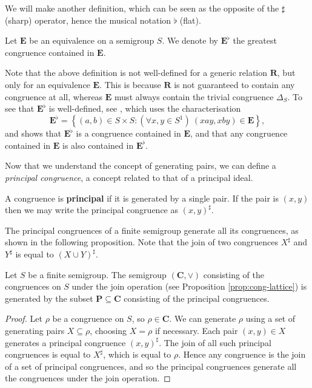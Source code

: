 We will make another definition, which can be seen as the opposite of the
$\sharp$ (sharp) operator, hence the musical notation $\flat$ (flat).

\begin{definition}
  \label{def:e-flat}
  Let $\mathbf{E}$ be an equivalence on a semigroup $S$.  We denote by
  $\mathbf{E}^\flat$ the greatest congruence contained in $\mathbf{E}$.
\end{definition}

Note that the above definition is not well-defined for a generic relation
$\mathbf{R}$, but only for an equivalence $\mathbf{E}$.  This is because
$\mathbf{R}$ is not guaranteed to contain any congruence at all, whereas
$\mathbf{E}$ must always contain the trivial congruence $\Delta_S$.
To see that $\mathbf{E}^\flat$ is well-defined, see \cite[Proposition
1.5.10]{howie}, which uses the characterisation
$$\mathbf{E}^\flat = \left\{
  (a,b) \in S \times S : (\forall x, y \in S^1)~(xay, xby) \in \mathbf{E}
\right\},$$ and shows that $\mathbf{E}^\flat$ is a congruence contained in
$\mathbf{E}$, and that any congruence contained in $\mathbf{E}$ is also
contained in $\mathbf{E}^\flat$.

Now that we understand the concept of generating pairs, we can define a
\textit{principal congruence}, a concept related to that of a principal ideal.

\begin{definition}
  \label{def:principal-cong}
  A congruence is \textbf{principal} if it is generated by a single pair.  If
  the pair is $(x,y)$ then we may write the principal congruence as
  $(x,y)^\sharp$.
\end{definition}

The principal congruences of a finite semigroup generate all its congruences, as
shown in the following proposition.  Note that the join of two congruences
$X^\sharp$ and $Y^\sharp$ is equal to $(X \cup Y)^\sharp$.

\begin{proposition}
  \label{prop:congruence-lattice-gens}
  Let $S$ be a finite semigroup.  The semigroup $(\mathbf{C}, \vee)$ consisting
  of the congruences on $S$ under the join operation (see Proposition
  \ref{prop:cong-lattice}) is generated by the subset
  $\mathbf{P} \subseteq \mathbf{C}$ consisting of the principal congruences.
  \begin{proof}
    Let $\rho$ be a congruence on $S$, so $\rho \in \mathbf{C}$.  We can
    generate $\rho$ using a set of generating pairs $X \subseteq \rho$, choosing
    $X = \rho$ if necessary.  Each pair $(x,y) \in X$ generates a principal
    congruence $(x,y)^\sharp$.  The join of all such principal congruences is
    equal to $X^\sharp$, which is equal to $\rho$.  Hence any congruence is the
    join of a set of principal congruences, and so the principal congruences
    generate all the congruences under the join operation.
  \end{proof}
\end{proposition}

